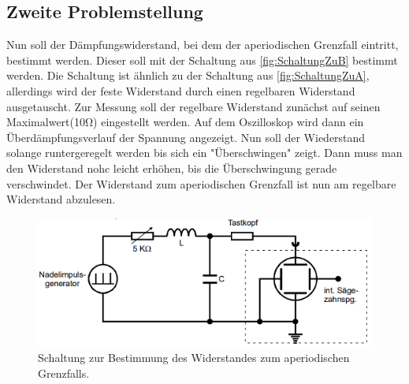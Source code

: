 \subsection{Zweite Problemstellung}
Nun soll der Dämpfungswiderstand, bei dem der aperiodischen Grenzfall eintritt, bestimmt werden. Dieser soll mit der Schaltung aus \autoref{fig:SchaltungZuB} bestimmt werden. 
Die Schaltung ist ähnlich zu der Schaltung aus \autoref{fig:SchaltungZuA}, allerdings wird der feste Widerstand durch einen regelbaren Widerstand ausgetauscht. Zur Messung 
soll der regelbare Widerstand zunächst auf seinen Maximalwert(10\unit{\ohm}) eingestellt werden. Auf dem Oszilloskop wird dann ein Überdämpfungsverlauf der Spannung angezeigt.
Nun soll der Wiederstand solange runtergeregelt werden bis sich ein "Überschwingen" zeigt. Dann muss man den Widerstand nohc leicht erhöhen, bis die Überschwingung gerade 
verschwindet. Der Widerstand zum aperiodischen Grenzfall ist nun am regelbare Widerstand abzulesen.
\begin{figure}
    \centering
    \includegraphics[width=\textwidth]{content/SchaltungZuB.pdf}
    \caption{Schaltung zur Bestimmung des Widerstandes zum aperiodischen Grenzfalls.}    
    \label{fig:SchaltungZuB}
\end{figure}
